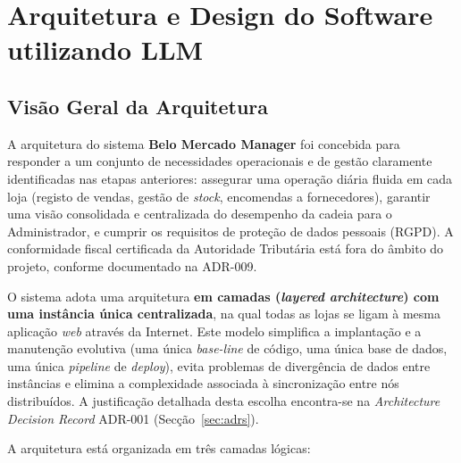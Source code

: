 %


\chapter{Arquitetura e Design do Software utilizando LLM}
\label{cap:arquitetura}

\section{Visão Geral da Arquitetura}

    A arquitetura do sistema \textbf{Belo Mercado Manager} foi concebida para responder a um conjunto de necessidades operacionais e de gestão claramente identificadas nas etapas anteriores: assegurar uma operação diária fluida em cada loja (registo de vendas, gestão de \textit{stock}, encomendas a fornecedores), garantir uma visão consolidada e centralizada do desempenho da cadeia para o Administrador, e cumprir os requisitos de proteção de dados pessoais (RGPD). A conformidade fiscal certificada da Autoridade Tributária está fora do âmbito do projeto, conforme documentado na ADR-009.

    O sistema adota uma arquitetura \textbf{em camadas (\textit{layered architecture}) com uma instância única centralizada}, na qual todas as lojas se ligam à mesma aplicação \textit{web} através da Internet. Este modelo simplifica a implantação e a manutenção evolutiva (uma única \textit{base-line} de código, uma única base de dados, uma única \textit{pipeline} de \textit{deploy}), evita problemas de divergência de dados entre instâncias e elimina a complexidade associada à sincronização entre nós distribuídos. A justificação detalhada desta escolha encontra-se na \textit{Architecture Decision Record} ADR-001 (Secção~\ref{sec:adrs}).

    A arquitetura está organizada em três camadas lógicas:

